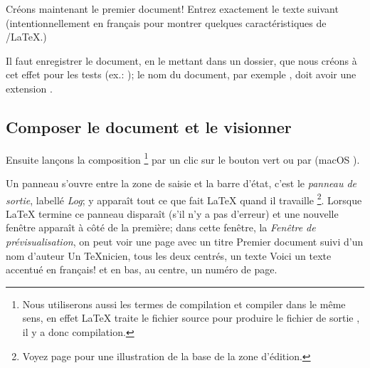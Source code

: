Créons maintenant le premier document! Entrez exactement le texte suivant (intentionnellement en français pour montrer quelques caractéristiques de \Tw/\LaTeX.)


Il faut enregistrer le document, en le mettant dans un dossier, que nous créons à cet effet pour les tests (ex.: ); le nom du document, par exemple , doit avoir une extension . 

\subsection{Composer le document et le visionner}

Ensuite lançons la composition \footnote{Nous utiliserons aussi les termes de compilation et compiler dans le même sens, en effet \LaTeX{} traite le fichier source pour produire le fichier de sortie , il y a donc compilation.} par un clic sur le bouton vert  ou par  (macOS ).

Un panneau s'ouvre entre la zone de saisie et la barre d'état, c'est le \emph{panneau de sortie}, labellé \emph{Log}; y apparaît tout ce que fait \LaTeX{} quand il travaille \footnote{Voyez page \pageref{fig:consoleOutput} pour une illustration de la base de la zone d'édition.}. Lorsque \LaTeX{} termine ce panneau disparaît (s'il n'y a pas d'erreur) et une nouvelle fenêtre apparaît à côté de la première; dans cette fenêtre, la \emph{Fenêtre de prévisualisation}, on peut voir une page avec un titre \og Premier document\fg{} suivi d'un nom d'auteur \og Un TeXnicien\fg, tous les deux centrés, un texte \og Voici un texte accentué en français!\fg{} et en bas, au centre, un numéro de page.

